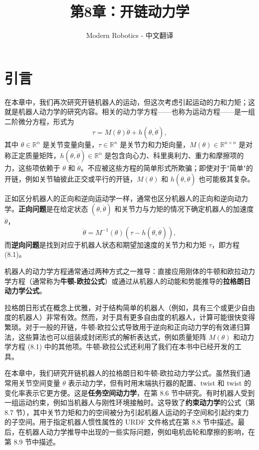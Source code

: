 \documentclass[12pt,a4paper]{article}
\title{第8章：开链动力学}
\author{Modern Robotics - 中文翻译}
\date{}
\begin{document}
\maketitle

\tableofcontents
\newpage

\section{引言}

在本章中，我们再次研究开链机器人的运动，但这次考虑引起运动的力和力矩；这就是机器人动力学的研究内容。相关的动力学方程——也称为运动方程——是一组二阶微分方程，形式为
\begin{equation}
\tau = M(\theta)\ddot{\theta} + h(\theta, \dot{\theta}), \label{eq:8.1}
\end{equation}
其中 $\theta \in \mathbb{R}^n$ 是关节变量向量，$\tau \in \mathbb{R}^n$ 是关节力和力矩向量，$M(\theta) \in \mathbb{R}^{n \times n}$ 是对称正定质量矩阵，$h(\theta, \dot{\theta}) \in \mathbb{R}^n$ 是包含向心力、科里奥利力、重力和摩擦项的力，这些项依赖于 $\theta$ 和 $\dot{\theta}$。不应被这些方程的简单形式所欺骗；即使对于"简单"的开链，例如关节轴彼此正交或平行的开链，$M(\theta)$ 和 $h(\theta, \dot{\theta})$ 也可能极其复杂。

正如区分机器人的正向和逆向运动学一样，通常也区分机器人的正向和逆向动力学。\textbf{正向问题}是在给定状态 $(\theta, \dot{\theta})$ 和关节力与力矩的情况下确定机器人的加速度 $\ddot{\theta}$，
\begin{equation}
\ddot{\theta} = M^{-1}(\theta)\left(\tau - h(\theta, \dot{\theta})\right), \label{eq:8.2}
\end{equation}
而\textbf{逆向问题}是找到对应于机器人状态和期望加速度的关节力和力矩 $\tau$，即方程 (8.1)。

机器人的动力学方程通常通过两种方式之一推导：直接应用刚体的牛顿和欧拉动力学方程（通常称为\textbf{牛顿-欧拉公式}）或通过从机器人的动能和势能推导的\textbf{拉格朗日动力学公式}。

拉格朗日形式在概念上优雅，对于结构简单的机器人（例如，具有三个或更少自由度的机器人）非常有效。然而，对于具有更多自由度的机器人，计算可能很快变得繁琐。对于一般的开链，牛顿-欧拉公式导致用于逆向和正向动力学的有效递归算法，这些算法也可以组装成封闭形式的解析表达式，例如质量矩阵 $M(\theta)$ 和动力学方程 (8.1) 中的其他项。牛顿-欧拉公式还利用了我们在本书中已经开发的工具。

在本章中，我们研究开链机器人的拉格朗日和牛顿-欧拉动力学公式。虽然我们通常用关节空间变量 $\theta$ 表示动力学，但有时用末端执行器的配置、twist 和 twist 的变化率表示它更方便。这是\textbf{任务空间动力学}，在第 8.6 节中研究。有时机器人受到一组运动约束，例如当机器人与刚性环境接触时。这导致了\textbf{约束动力学}的公式（第 8.7 节），其中关节力矩和力的空间被分为引起机器人运动的子空间和引起约束力的子空间。用于指定机器人惯性属性的 URDF 文件格式在第 8.8 节中描述。最后，在机器人动力学推导中出现的一些实际问题，例如电机齿轮和摩擦的影响，在第 8.9 节中描述。
\end{document}
